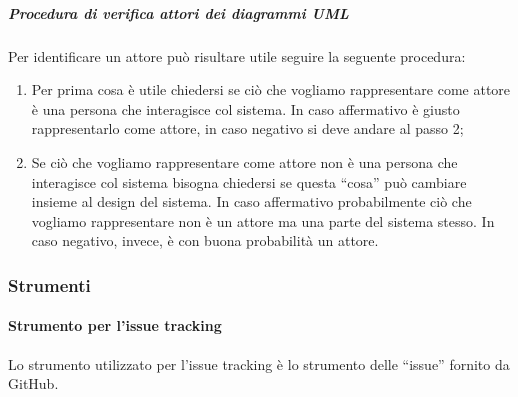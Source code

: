 \documentclass[../NormeProgetto.tex]{subfiles}
\begin{document}
		
		\subparagraph{Procedura di verifica attori dei diagrammi UML}\label{par:Procedura di verifica degli attori dei diagrammi UML}
		Per identificare un attore può risultare utile seguire la seguente procedura:
			\begin{enumerate}
				\item Per prima cosa è utile chiedersi se ciò che vogliamo rappresentare come attore è una persona che interagisce col sistema. In caso affermativo è giusto rappresentarlo come attore, in caso negativo si deve andare al passo 2;
				\item Se ciò che vogliamo rappresentare come attore non è una persona che interagisce col sistema bisogna chiedersi se questa ``cosa'' può cambiare insieme al design del sistema. In caso affermativo probabilmente ciò che vogliamo rappresentare non è un attore ma una parte del sistema stesso. In caso negativo, invece, è con buona probabilità un attore.
			\end{enumerate}
	
	\subsubsection{Strumenti} \label{sec:Strumenti}
		\paragraph{Strumento per l'issue tracking} \label{par:IssueTrk GitHub}
		Lo strumento utilizzato per l'issue tracking è lo strumento delle ``issue'' fornito da GitHub.
		
\end{document}
